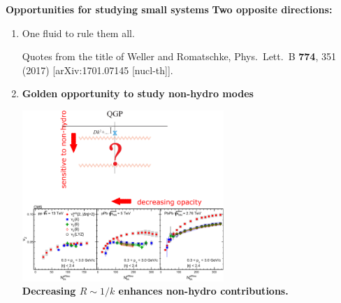 \documentclass[9pt,a4paper,unknownkeysallowed,xcolor=dvipsnames,aspectratio=43]{beamer}
\begin{document}
%
%
%
\begin{frame}{\bf\huge Opportunities for studying small systems}
\vspace{4mm}
{\bf \large Two opposite directions:}
\vspace{2mm}
\begin{enumerate}
\item{\large One fluid to rule them all.}
\begin{center}
{\tiny Quotes from the title of {\color{teablue}
  Weller and Romatschke,
  Phys.\ Lett.\ B {\bf 774}, 351 (2017)
  [arXiv:1701.07145 [nucl-th]].
}}
\end{center}
\vspace{2mm}
\item{\large\bf \color{darkred} Golden opportunity to study non-hydro modes}
\vspace{2mm}
\begin{center}
\includegraphics[width=0.6\textwidth]{fig/goal}
\vspace{2mm}\\
{\color{white}\bf\LARGE Decreasing $R\sim 1/k$ enhances non-hydro contributions.}
\end{center}
\end{enumerate}
\end{frame}
%
%
\end{document}
